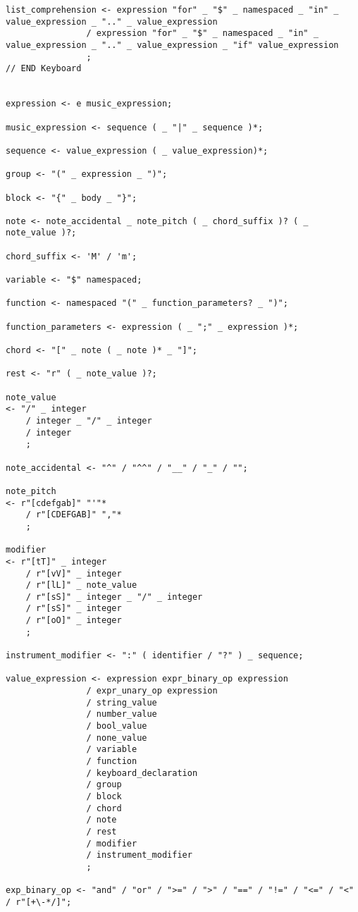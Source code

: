 \begin{lstlisting}
list_comprehension <- expression "for" _ "$" _ namespaced _ "in" _ value_expression _ ".." _ value_expression
                / expression "for" _ "$" _ namespaced _ "in" _ value_expression _ ".." _ value_expression _ "if" value_expression
                ;
// END Keyboard


expression <- e music_expression;

music_expression <- sequence ( _ "|" _ sequence )*;

sequence <- value_expression ( _ value_expression)*;

group <- "(" _ expression _ ")";

block <- "{" _ body _ "}";

note <- note_accidental _ note_pitch ( _ chord_suffix )? ( _ note_value )?;

chord_suffix <- 'M' / 'm';

variable <- "$" namespaced;

function <- namespaced "(" _ function_parameters? _ ")";

function_parameters <- expression ( _ ";" _ expression )*;

chord <- "[" _ note ( _ note )* _ "]";

rest <- "r" ( _ note_value )?;

note_value
<- "/" _ integer
    / integer _ "/" _ integer
    / integer
    ;

note_accidental <- "^" / "^^" / "__" / "_" / "";

note_pitch
<- r"[cdefgab]" "'"*
    / r"[CDEFGAB]" ","*
    ;

modifier
<- r"[tT]" _ integer
    / r"[vV]" _ integer
    / r"[lL]" _ note_value
    / r"[sS]" _ integer _ "/" _ integer
    / r"[sS]" _ integer
    / r"[oO]" _ integer
    ;

instrument_modifier <- ":" ( identifier / "?" ) _ sequence;

value_expression <- expression expr_binary_op expression
                / expr_unary_op expression
                / string_value 
                / number_value 
                / bool_value 
                / none_value 
                / variable 
                / function 
                / keyboard_declaration 
                / group 
                / block 
                / chord 
                / note 
                / rest 
                / modifier 
                / instrument_modifier
                ;

exp_binary_op <- "and" / "or" / ">=" / ">" / "==" / "!=" / "<=" / "<" / r"[+\-*/]";


\end{lstlisting}
